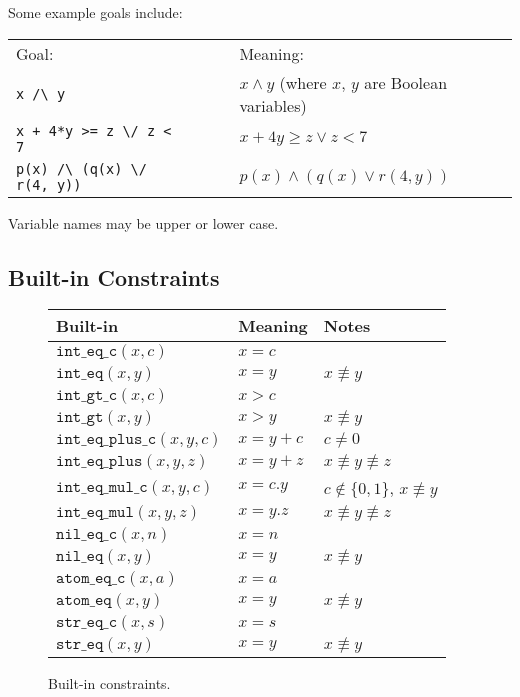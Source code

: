 \documentclass{article}
\begin{document}
\noindent Some example goals include:
\vspace{-1em}
\begin{center}
\begin{tabular}{lll}
Goal: & & Meaning: \\
\verb+x /\ y+ & ~~~ & $x \wedge y$ (where $x$, $y$ are Boolean variables)
    \\
\verb?x + 4*y >= z \/ z < 7? & & $x + 4y \geq z \vee z < 7$ \\
\verb+p(x) /\ (q(x) \/ r(4, y))+ & & $p(x) \wedge (q(x) \vee r(4, y))$
\end{tabular}
\end{center}
Variable names may be upper or lower case.

\subsection{Built-in Constraints}

\begin{figure}
\begin{center}
\begin{tabular}{|l|l|l|}
\hline
Built-in & Meaning & Notes \\
\hline
\hline
$\mathtt{int\_eq\_c}(x, c)$           & $x = c$     & \\
$\mathtt{int\_eq}(x, y)$              & $x = y$     & $x \not\equiv y$\\
$\mathtt{int\_gt\_c}(x, c)$           & $x > c$     & \\
$\mathtt{int\_gt}(x, y)$              & $x > y$     & $x \not\equiv y$ \\
$\mathtt{int\_eq\_plus\_c}(x, y, c)$  & $x = y + c$ & $c \neq 0$ \\
$\mathtt{int\_eq\_plus}(x, y, z)$     & $x = y + z$ &
    $x \not\equiv y \not\equiv z$ \\
$\mathtt{int\_eq\_mul\_c}(x, y, c)$   & $x = c.y$   & $c \not\in \{0, 1\}$,
    $x \not\equiv y$ \\
$\mathtt{int\_eq\_mul}(x, y, z)$      & $x = y.z$   &
    $x \not\equiv y \not\equiv z$ \\
\hline
$\mathtt{nil\_eq\_c}(x, n)$           & $x = n$     & \\
$\mathtt{nil\_eq}(x, y)$              & $x = y$     & $x \not\equiv y$\\
\hline
$\mathtt{atom\_eq\_c}(x, a)$          & $x = a$     & \\
$\mathtt{atom\_eq}(x, y)$             & $x = y$     & $x \not\equiv y$\\
\hline
$\mathtt{str\_eq\_c}(x, s)$           & $x = s$     & \\
$\mathtt{str\_eq}(x, y)$              & $x = y$     & $x \not\equiv y$\\
\hline
\end{tabular}
\end{center}
\caption{Built-in constraints.\label{fig:builtin}}
\end{figure}
\end{document}
